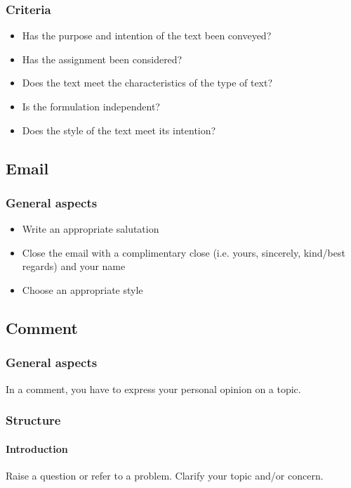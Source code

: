 \documentclass{article}
\begin{document}
	\subsubsection{Criteria}
	\begin{itemize}
		\item Has the purpose and intention of the text been conveyed?
		\item Has the assignment been considered?
		\item Does the text meet the characteristics of the type of text?
		\item Is the formulation independent?
		\item Does the style of the text meet its intention?
	\end{itemize}

	\subsection{Email}
	\subsubsection{General aspects}
	\begin{itemize}
		\item Write an appropriate salutation
		\item Close the email with a complimentary close (i.e. yours, sincerely, kind/best regards) and your name
		\item Choose an appropriate style
	\end{itemize}

	\subsection{Comment}
	\subsubsection{General aspects}
	In a comment, you have to express your personal opinion on a topic.

	\subsubsection{Structure}
	\paragraph{Introduction}
	Raise a question or refer to a problem. Clarify your topic and/or concern.
\end{document}
